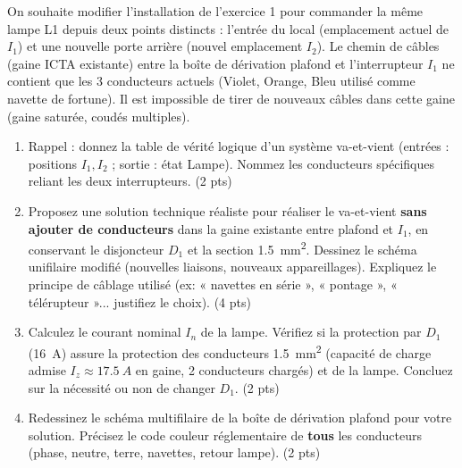 \documentclass[11pt]{article}
\begin{document}
\begin{exercice}
On souhaite modifier l'installation de l'exercice 1 pour commander la même lampe L1 depuis deux points distincts : l'entrée du local (emplacement actuel de $I_1$) et une nouvelle porte arrière (nouvel emplacement $I_2$). Le chemin de câbles (gaine ICTA existante) entre la boîte de dérivation plafond et l'interrupteur $I_1$ ne contient que les 3 conducteurs actuels (Violet, Orange, Bleu utilisé comme navette de fortune). Il est impossible de tirer de nouveaux câbles dans cette gaine (gaine saturée, coudés multiples).

\begin{enumerate}
\item Rappel : donnez la table de vérité logique d'un système va-et-vient (entrées : positions $I_1, I_2$ ; sortie : état Lampe). Nommez les conducteurs spécifiques reliant les deux interrupteurs. (2 pts)
\item Proposez une solution technique réaliste pour réaliser le va-et-vient \textbf{sans ajouter de conducteurs} dans la gaine existante entre plafond et $I_1$, en conservant le disjoncteur $D_1$ et la section \SI{1,5}{mm^2}. Dessinez le schéma unifilaire modifié (nouvelles liaisons, nouveaux appareillages). Expliquez le principe de câblage utilisé (ex: « navettes en série », « pontage », « télérupteur »... justifiez le choix). (4 pts)
\item Calculez le courant nominal $I_n$ de la lampe. Vérifiez si la protection par $D_1$ (\SI{16}{A}) assure la protection des conducteurs \SI{1,5}{mm^2} (capacité de charge admise $I_z \approx \SI{17,5}{A}$ en gaine, 2 conducteurs chargés) et de la lampe. Concluez sur la nécessité ou non de changer $D_1$. (2 pts)
\item Redessinez le schéma multifilaire de la boîte de dérivation plafond pour votre solution. Précisez le code couleur réglementaire de \textbf{tous} les conducteurs (phase, neutre, terre, navettes, retour lampe). (2 pts)
\end{enumerate}
\end{exercice}
\end{document}
